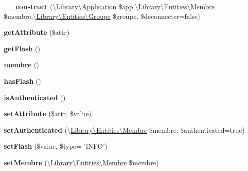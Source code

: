\begin{DoxyCompactItemize}
\item 
\hypertarget{class_library_1_1_user_a5a6f2d0ff2c39c922b1c298863254d1d}{{\bfseries \+\_\+\+\_\+construct} (\textbackslash{}\hyperlink{class_library_1_1_application}{Library\textbackslash{}\+Application} \$app,\textbackslash{}\hyperlink{class_library_1_1_entities_1_1_membre}{Library\textbackslash{}\+Entities\textbackslash{}\+Membre} \$membre,\textbackslash{}\hyperlink{class_library_1_1_entities_1_1_groupe}{Library\textbackslash{}\+Entities\textbackslash{}\+Groupe} \$groupe, \$deconnecter=false)}\label{class_library_1_1_user_a5a6f2d0ff2c39c922b1c298863254d1d}

\item 
\hypertarget{class_library_1_1_user_a8bb10d36825aaa0bddff001adb1ef133}{{\bfseries get\+Attribute} (\$attr)}\label{class_library_1_1_user_a8bb10d36825aaa0bddff001adb1ef133}

\item 
\hypertarget{class_library_1_1_user_a89b35eab140aa01439f2546354835577}{{\bfseries get\+Flash} ()}\label{class_library_1_1_user_a89b35eab140aa01439f2546354835577}

\item 
\hypertarget{class_library_1_1_user_aa5fed628b7824ed73d8e6344fde04934}{{\bfseries membre} ()}\label{class_library_1_1_user_aa5fed628b7824ed73d8e6344fde04934}

\item 
\hypertarget{class_library_1_1_user_a0fb55512f7be325f19e805a82d1dd4ab}{{\bfseries has\+Flash} ()}\label{class_library_1_1_user_a0fb55512f7be325f19e805a82d1dd4ab}

\item 
\hypertarget{class_library_1_1_user_a43186604926a3172896ce2353437d5b8}{{\bfseries is\+Authenticated} ()}\label{class_library_1_1_user_a43186604926a3172896ce2353437d5b8}

\item 
\hypertarget{class_library_1_1_user_ac39db7d47d329a199147d777d5a5d190}{{\bfseries set\+Attribute} (\$attr, \$value)}\label{class_library_1_1_user_ac39db7d47d329a199147d777d5a5d190}

\item 
\hypertarget{class_library_1_1_user_af1c52fd09af90da472d3d66528c775a2}{{\bfseries set\+Authenticated} (\textbackslash{}\hyperlink{class_library_1_1_entities_1_1_membre}{Library\textbackslash{}\+Entities\textbackslash{}\+Membre} \$membre, \$authenticated=true)}\label{class_library_1_1_user_af1c52fd09af90da472d3d66528c775a2}

\item 
\hypertarget{class_library_1_1_user_a7a8daaaabf1e98ecc01012e95f71091d}{{\bfseries set\+Flash} (\$value, \$type= 'I\+N\+F\+O')}\label{class_library_1_1_user_a7a8daaaabf1e98ecc01012e95f71091d}

\item 
\hypertarget{class_library_1_1_user_acdfa15a249c79c2e4af6f77600e5cb2b}{{\bfseries set\+Membre} (\textbackslash{}\hyperlink{class_library_1_1_entities_1_1_membre}{Library\textbackslash{}\+Entities\textbackslash{}\+Membre} \$membre)}\label{class_library_1_1_user_acdfa15a249c79c2e4af6f77600e5cb2b}

\end{DoxyCompactItemize}
